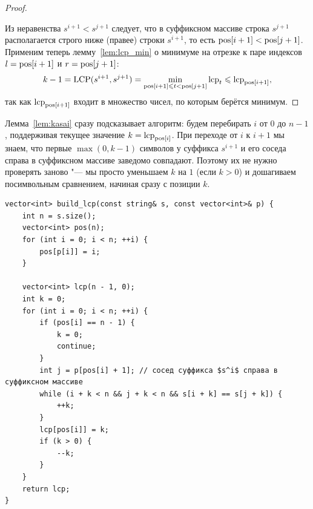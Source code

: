 \begin{proof}
\begin{center}
    \end{center}

    Из неравенства $s^{i+1} < s^{j+1}$ следует, что в суффиксном массиве строка $s^{j+1}$ располагается строго ниже (правее) строки $s^{i+1}$, то есть $\operatorname{pos}[i+1] < \operatorname{pos}[j+1]$. Применим теперь лемму~\ref{lem:lcp_min} о минимуме на отрезке к паре индексов $l = \operatorname{pos}[i+1]$ и $r = \operatorname{pos}[j+1]$:
    \[
        k - 1 = \operatorname{LCP}(s^{i+1}, s^{j+1}) = \min_{\operatorname{pos}[i+1] \leqslant t < \operatorname{pos}[j+1]} \operatorname{lcp}_t \leqslant \operatorname{lcp}_{\operatorname{pos}[i+1]},
    \]
    так как $\operatorname{lcp}_{\operatorname{pos}[i+1]}$ входит в множество чисел, по которым берётся минимум.
\end{proof}

Лемма~\ref{lem:kasai} сразу подсказывает алгоритм: будем перебирать $i$ от $0$ до $n-1$, поддерживая текущее значение $k = \operatorname{lcp}_{\operatorname{pos}[i]}$. При переходе от $i$ к $i + 1$ мы знаем, что первые $\max(0, k - 1)$ символов у суффикса $s^{i+1}$ и его соседа справа в суффиксном массиве заведомо совпадают. Поэтому их не нужно проверять заново "--- мы просто уменьшаем $k$ на $1$ (если $k > 0$) и дошагиваем посимвольным сравнением, начиная сразу с позиции $k$.

\begin{lstlisting}[caption={Алгоритм Касаи построения массива $\lcp$ за $O(n)$}]
vector<int> build_lcp(const string& s, const vector<int>& p) {
    int n = s.size();
    vector<int> pos(n);
    for (int i = 0; i < n; ++i) {
        pos[p[i]] = i;
    }

    vector<int> lcp(n - 1, 0);
    int k = 0;
    for (int i = 0; i < n; ++i) {
        if (pos[i] == n - 1) {
            k = 0;
            continue;
        }
        int j = p[pos[i] + 1]; // сосед суффикса $s^i$ справа в суффиксном массиве
        while (i + k < n && j + k < n && s[i + k] == s[j + k]) {
            ++k;
        }
        lcp[pos[i]] = k;
        if (k > 0) {
            --k;
        }
    }
    return lcp;
}
\end{lstlisting}

